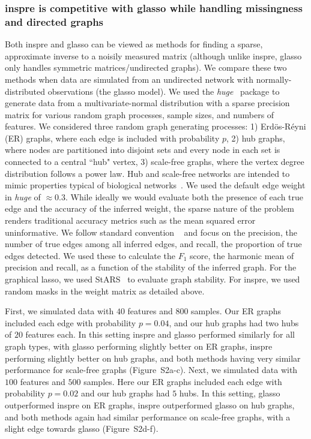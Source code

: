 \documentclass{article}
\begin{document}
\subsubsection*{inspre is competitive with glasso while handling missingness and directed graphs}
Both inspre and glasso can be viewed as methods
for finding a sparse, approximate inverse to a noisily measured matrix (although unlike inspre, glasso only handles symmetric matrices/undirected graphs).
We compare these two methods when data are simulated
from an undirected network with normally-distributed observations (the glasso model). We used the \emph{huge}~\cite{Zhao2012} package to generate data
from a multivariate-normal distribution with a sparse precision matrix
for various random graph processes, sample sizes, and numbers of features.
We considered three random graph generating processes: 1) Erd\"os-R\'eyni (ER) graphs,
where each edge is included with probability $p$, 2) hub graphs, where nodes
are partitioned into
disjoint sets and every node in each set is connected to a central ``hub" vertex,
3) scale-free graphs, where the vertex degree distribution
follows a power law. Hub and scale-free networks are intended to mimic properties typical of
biological networks~\cite{Barabasi1999}.
We used the default edge weight in \emph{huge} of $\approx 0.3$.
While ideally we would evaluate both the presence of each true edge and the accuracy of the inferred weight,
the sparse nature of the problem renders traditional accuracy metrics such as
the mean squared error uninformative. We follow standard convention
~\cite{Friedman2007, Liu2010, Zhao2012} and focus on the precision,
the number of true edges among all inferred edges, and recall, the proportion
of true edges detected. We used these to calculate the $F_1$ score, the
harmonic mean of precision and recall, as a function of the
stability of the inferred graph. For the graphical lasso, we used StARS~\cite{Liu2010} to
evaluate graph stability. For inspre, we used random masks in the weight matrix
as detailed above.

First, we simulated data with $40$ features and $800$ samples. Our ER
graphs included each edge with probability $p=0.04$, and our hub graphs had
two hubs of $20$ features each. In this setting inspre and glasso performed
similarly for all graph types, with glasso performing slightly better on
ER graphs, inspre performing slightly better on hub graphs, and 
both methods having very similar performance for scale-free graphs
(Figure~S2a-c). Next, we simulated  data with $100$
features and $500$ samples. Here our ER graphs included each edge with
probability $p=0.02$ and our hub graphs had $5$ hubs. In this setting, glasso outperformed inspre on
ER graphs, inspre outperformed glasso on hub graphs, and both methods again
had similar performance on scale-free graphs, with a slight edge towards
glasso (Figure~S2d-f).
\end{document}
